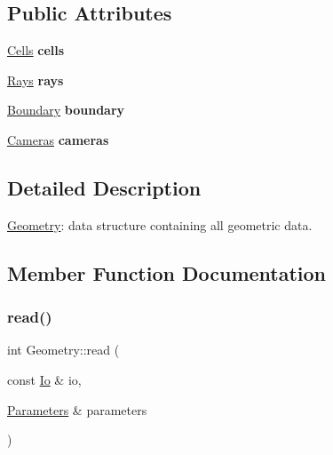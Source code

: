 \subsection*{Public Attributes}
\begin{DoxyCompactItemize}
\item 
\mbox{\label{structGeometry_ab8fc1c31027c93d1e82f46111951966c}} 
\mbox{\hyperlink{structCells}{Cells}} {\bfseries cells}
\item 
\mbox{\label{structGeometry_ab40f75e6744eff6f8a04459cb5a770fa}} 
\mbox{\hyperlink{structRays}{Rays}} {\bfseries rays}
\item 
\mbox{\label{structGeometry_a9153b970abf6d0a7ac6074688c4833cc}} 
\mbox{\hyperlink{structBoundary}{Boundary}} {\bfseries boundary}
\item 
\mbox{\label{structGeometry_ad66836932a465d3cb214d7a3d399c9d8}} 
\mbox{\hyperlink{structCameras}{Cameras}} {\bfseries cameras}
\end{DoxyCompactItemize}


\subsection{Detailed Description}
\mbox{\hyperlink{structGeometry}{Geometry}}\+: data structure containing all geometric data. 

\subsection{Member Function Documentation}
\mbox{\label{structGeometry_a129743f34789020e93923a15f85dcfc9}} 
\subsubsection{\texorpdfstring{read()}{read()}}
{\footnotesize\ttfamily int Geometry\+::read (\begin{DoxyParamCaption}\item[{const \mbox{\hyperlink{structIo}{Io}} \&}]{io,  }\item[{\mbox{\hyperlink{classParameters}{Parameters}} \&}]{parameters }\end{DoxyParamCaption})}

